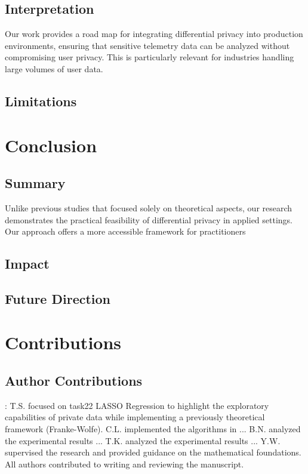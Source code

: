\documentclass[12pt,letterpaper]{article}
\begin{document}
\begin{table}[h]
\subsection{Interpretation}
Our work provides a road map for integrating differential privacy into production environments, ensuring that sensitive telemetry data can be analyzed without compromising user privacy. This is particularly relevant for industries handling large volumes of user data. 


\subsection{Limitations}




\section{Conclusion}


\subsection{Summary}
Unlike previous studies that focused solely on theoretical aspects, our research demonstrates the practical feasibility of differential privacy in applied settings. Our approach offers a more accessible framework for practitioners

\subsection{Impact}


\subsection{Future Direction}




\section{Contributions}

\subsection{Author Contributions}:
T.S. focused on task22 LASSO Regression to highlight the exploratory capabilities of private data while implementing a previously theoretical framework (Franke-Wolfe). C.L. implemented the algorithms in ... B.N. analyzed the experimental results ... T.K. analyzed the experimental results ... Y.W. supervised the research and provided guidance on the mathematical foundations. All authors contributed to writing and reviewing the manuscript.


\end{table}
\end{document}
